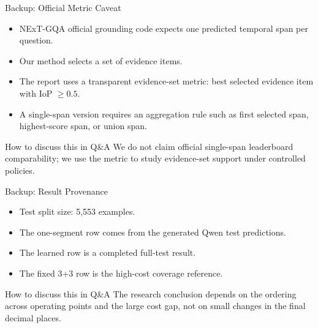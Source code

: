 \documentclass[aspectratio=169]{beamer}
\begin{document}
\appendix

\begin{frame}{Backup: Official Metric Caveat}
  \begin{itemize}
    \item NExT-GQA official grounding code expects one predicted temporal span per question.
    \item Our method selects a set of evidence items.
    \item The report uses a transparent evidence-set metric: best selected evidence item with IoP $\geq 0.5$.
    \item A single-span version requires an aggregation rule such as first selected span, highest-score span, or union span.
  \end{itemize}

  \begin{block}{How to discuss this in Q\&A}
    We do not claim official single-span leaderboard comparability; we use the metric to study evidence-set support under controlled policies.
  \end{block}
\end{frame}

\begin{frame}{Backup: Result Provenance}
  \begin{itemize}
    \item Test split size: 5,553 examples.
    \item The one-segment row comes from the generated Qwen test predictions.
    \item The learned row is a completed full-test result.
    \item The fixed 3+3 row is the high-cost coverage reference.
  \end{itemize}

  \begin{block}{How to discuss this in Q\&A}
    The research conclusion depends on the ordering across operating points and the large cost gap, not on small changes in the final decimal places.
  \end{block}
\end{frame}
\end{document}
